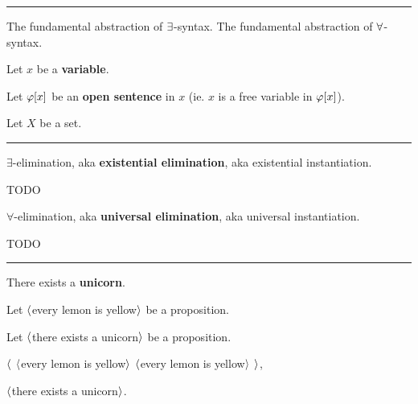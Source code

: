 \vs\hrule\vskip1pt

 The fundamental abstraction of $\a\exists$-syntax. The fundamental abstraction of $\a\forall$-syntax. \par
Let $x$ be a {\bf variable}. \par
Let $\g\varphi[x]$ be an {\bf open sentence} in $x$ (ie. $x$ is a free variable in $\g\varphi[x]$). \par
Let $X$ be a set. \par
{}

\vs\hrule\vskip1pt

 $\exists$-elimination, aka {\bf existential elimination}, aka existential instantiation. \par
TODO

\vs
{} $\forall$-elimination, aka {\bf universal elimination}, aka universal instantiation. \par
TODO

\vs\hrule\vskip1pt
\theorem There exists a {\bf unicorn}. \par
Let $\a\langle$every lemon is yellow$\a\rangle$ be a proposition. \par
Let $\a\langle$there exists a unicorn$\a\rangle$ be a proposition. \par
    $\a\langle$ $\a\langle$every lemon is yellow$\a\rangle$  $\a\langle$every lemon is yellow$\a\rangle$ $\a\rangle$, \par
  \hs\hs{} $\a\langle$there exists a unicorn$\a\rangle$. \par

